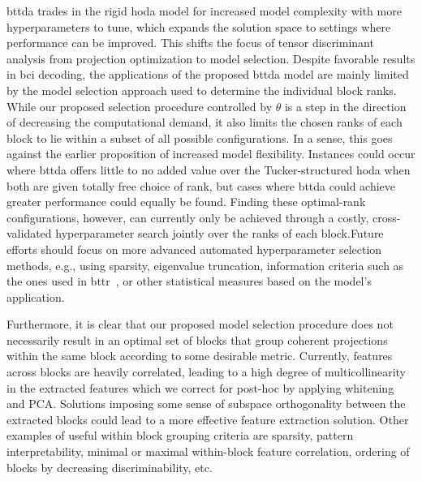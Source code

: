 \documentclass[twocolumn]{article}
\begin{document}
	\Ac{bttda} trades in the rigid \ac{hoda} model for increased model complexity with more
	hyperparameters to tune, which expands the solution space to settings where performance can be
	improved.
	This shifts the focus of tensor discriminant analysis from projection
	optimization to model selection.
	Despite favorable results in \ac{bci} decoding, the applications of the proposed
	\ac{bttda} model are mainly limited by the model selection approach used
	to determine the individual block ranks.
	While our proposed selection procedure controlled by $\theta$
	is a step in the direction of decreasing the computational demand, it
	also limits the chosen ranks of each block to lie within a subset of all possible configurations.
	In a sense, this goes against the earlier proposition of increased model flexibility.
	Instances could occur where \ac{bttda} offers little to no added value over the
	Tucker-structured \ac{hoda} when both are given totally free choice of rank, but cases where \ac{bttda} could achieve greater performance could equally be found.
	Finding these optimal-rank configurations, however, can currently only be achieved
	through a costly, cross-validated hyperparameter search jointly over the ranks of each block.Future efforts should focus on more advanced automated hyperparameter selection methods, e.g., using sparsity,
	eigenvalue truncation, information criteria such as the ones used in
	\ac{bttr}~\cite{Faes2022}, or other statistical measures based on the model's
	application.

	Furthermore, it is clear that our proposed model selection procedure does not
	necessarily result in an optimal set of blocks that group coherent projections
	within the same block according to some desirable metric.
	Currently, features across blocks are heavily correlated, leading to a high
	degree of multicollinearity in the extracted features which we correct for post-hoc
	by applying whitening and PCA.
	Solutions imposing some sense of subspace orthogonality between the extracted blocks
	could lead to a more effective feature extraction solution.
	Other examples of useful within block grouping criteria are sparsity,
	pattern interpretability, minimal or maximal within-block feature correlation,
	ordering of blocks by decreasing discriminability, etc.
\end{document}
